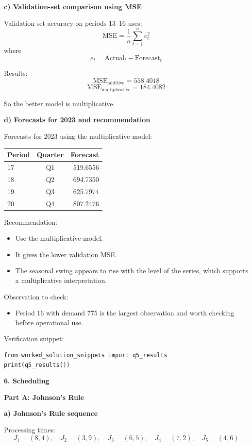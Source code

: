\documentclass[11pt,a4paper]{article}
\begin{document}
\textbf{c) Validation-set comparison using MSE}

Validation-set accuracy on periods 13--16 uses:
\[
\mathrm{MSE} = \frac{1}{n}\sum_{t=1}^{n} e_t^2
\]
where
\[
e_t = \text{Actual}_t - \text{Forecast}_t
\]

Results:
\[
\mathrm{MSE}_{\text{additive}} = 558.4018
\]
\[
\mathrm{MSE}_{\text{multiplicative}} = 184.4082
\]

So the better model is multiplicative.

\textbf{d) Forecasts for 2023 and recommendation}

Forecasts for 2023 using the multiplicative model:

\begin{center}
\begin{tabular}{lcr}
\toprule
Period & Quarter & Forecast \\
\midrule
17 & Q1 & 519.6556 \\
18 & Q2 & 694.7350 \\
19 & Q3 & 625.7974 \\
20 & Q4 & 807.2476 \\
\bottomrule
\end{tabular}
\end{center}

Recommendation:
\begin{itemize}
\item Use the multiplicative model.
\item It gives the lower validation MSE.
\item The seasonal swing appears to rise with the level of the series, which supports a multiplicative interpretation.
\end{itemize}

Observation to check:
\begin{itemize}
\item Period 16 with demand 775 is the largest observation and worth checking before operational use.
\end{itemize}

Verification snippet:
\begin{verbatim}
from worked_solution_snippets import q5_results
print(q5_results())
\end{verbatim}

\textbf{6. Scheduling}

\textbf{Part A: Johnson's Rule}

\textbf{a) Johnson's Rule sequence}

Processing times:
\[
J_1 = (8,4), \quad J_2 = (3,9), \quad J_3 = (6,5), \quad J_4 = (7,2), \quad J_5 = (4,6)
\]
\end{document}
